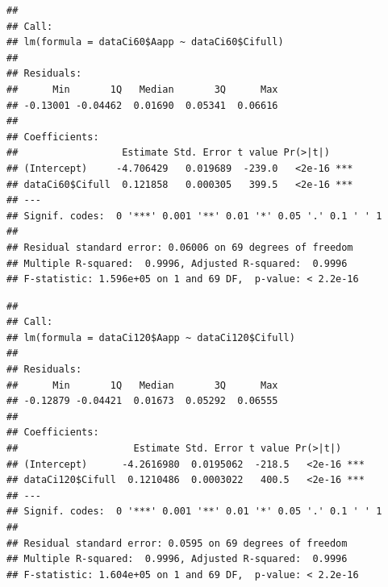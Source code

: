 \documentclass[
]{krantz}
\makeatletter
\newenvironment{Shaded}{\begin{snugshade}}{\end{snugshade}}
\newcommand{\DecValTok}[1]{\textcolor[rgb]{0.00,0.00,0.81}{#1}}
\newcommand{\FunctionTok}[1]{\textcolor[rgb]{0.00,0.00,0.00}{#1}}
\newcommand{\NormalTok}[1]{#1}
\newcommand{\OtherTok}[1]{\textcolor[rgb]{0.56,0.35,0.01}{#1}}
\newcommand{\SpecialCharTok}[1]{\textcolor[rgb]{0.00,0.00,0.00}{#1}}
\newenvironment{kframe}{%
\medskip{}
\setlength{\fboxsep}{.8em}
 \def\at@end@of@kframe{}%
 \ifinner\ifhmode%
  \def\at@end@of@kframe{\end{minipage}}%
  \begin{minipage}{\columnwidth}%
 \fi\fi%
 \def\FrameCommand##1{\hskip\@totalleftmargin \hskip-\fboxsep
 \colorbox{shadecolor}{##1}\hskip-\fboxsep
     \hskip-\linewidth \hskip-\@totalleftmargin \hskip\columnwidth}%
 \MakeFramed {\advance\hsize-\width
   \@totalleftmargin\z@ \linewidth\hsize
   \@setminipage}}%
 {\par\unskip\endMakeFramed%
 \at@end@of@kframe}
\renewenvironment{Shaded}{\begin{kframe}}{\end{kframe}}
\makeatother
\begin{document}
\begin{verbatim}
## 
## Call:
## lm(formula = dataCi60$Aapp ~ dataCi60$Cifull)
## 
## Residuals:
##      Min       1Q   Median       3Q      Max 
## -0.13001 -0.04462  0.01690  0.05341  0.06616 
## 
## Coefficients:
##                  Estimate Std. Error t value Pr(>|t|)    
## (Intercept)     -4.706429   0.019689  -239.0   <2e-16 ***
## dataCi60$Cifull  0.121858   0.000305   399.5   <2e-16 ***
## ---
## Signif. codes:  0 '***' 0.001 '**' 0.01 '*' 0.05 '.' 0.1 ' ' 1
## 
## Residual standard error: 0.06006 on 69 degrees of freedom
## Multiple R-squared:  0.9996, Adjusted R-squared:  0.9996 
## F-statistic: 1.596e+05 on 1 and 69 DF,  p-value: < 2.2e-16
\end{verbatim}

\begin{Shaded}
\end{Shaded}

\begin{verbatim}
## 
## Call:
## lm(formula = dataCi120$Aapp ~ dataCi120$Cifull)
## 
## Residuals:
##      Min       1Q   Median       3Q      Max 
## -0.12879 -0.04421  0.01673  0.05292  0.06555 
## 
## Coefficients:
##                    Estimate Std. Error t value Pr(>|t|)    
## (Intercept)      -4.2616980  0.0195062  -218.5   <2e-16 ***
## dataCi120$Cifull  0.1210486  0.0003022   400.5   <2e-16 ***
## ---
## Signif. codes:  0 '***' 0.001 '**' 0.01 '*' 0.05 '.' 0.1 ' ' 1
## 
## Residual standard error: 0.0595 on 69 degrees of freedom
## Multiple R-squared:  0.9996, Adjusted R-squared:  0.9996 
## F-statistic: 1.604e+05 on 1 and 69 DF,  p-value: < 2.2e-16
\end{verbatim}

\begin{Shaded}
\end{Shaded}
\end{document}
